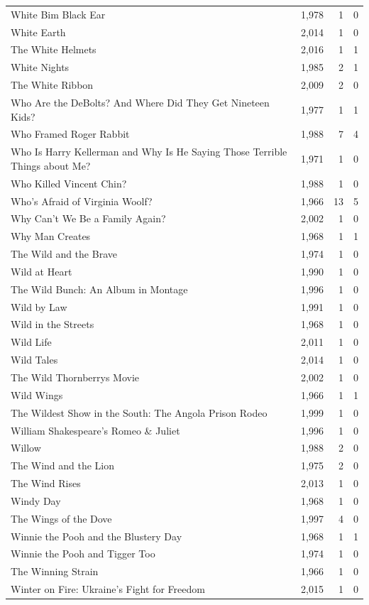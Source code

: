 \begin{tabular}{lrrr}
White Bim Black Ear & 1,978 & 1 & 0 \\
White Earth & 2,014 & 1 & 0 \\
The White Helmets & 2,016 & 1 & 1 \\
White Nights & 1,985 & 2 & 1 \\
The White Ribbon & 2,009 & 2 & 0 \\
Who Are the DeBolts? And Where Did They Get Nineteen Kids? & 1,977 & 1 & 1 \\
Who Framed Roger Rabbit & 1,988 & 7 & 4 \\
Who Is Harry Kellerman and Why Is He Saying Those Terrible Things about Me? & 1,971 & 1 & 0 \\
Who Killed Vincent Chin? & 1,988 & 1 & 0 \\
Who's Afraid of Virginia Woolf? & 1,966 & 13 & 5 \\
Why Can't We Be a Family Again? & 2,002 & 1 & 0 \\
Why Man Creates & 1,968 & 1 & 1 \\
The Wild and the Brave & 1,974 & 1 & 0 \\
Wild at Heart & 1,990 & 1 & 0 \\
The Wild Bunch: An Album in Montage & 1,996 & 1 & 0 \\
Wild by Law & 1,991 & 1 & 0 \\
Wild in the Streets & 1,968 & 1 & 0 \\
Wild Life & 2,011 & 1 & 0 \\
Wild Tales & 2,014 & 1 & 0 \\
The Wild Thornberrys Movie & 2,002 & 1 & 0 \\
Wild Wings & 1,966 & 1 & 1 \\
The Wildest Show in the South: The Angola Prison Rodeo & 1,999 & 1 & 0 \\
William Shakespeare's Romeo \& Juliet & 1,996 & 1 & 0 \\
Willow & 1,988 & 2 & 0 \\
The Wind and the Lion & 1,975 & 2 & 0 \\
The Wind Rises & 2,013 & 1 & 0 \\
Windy Day & 1,968 & 1 & 0 \\
The Wings of the Dove & 1,997 & 4 & 0 \\
Winnie the Pooh and the Blustery Day & 1,968 & 1 & 1 \\
Winnie the Pooh and Tigger Too & 1,974 & 1 & 0 \\
The Winning Strain & 1,966 & 1 & 0 \\
Winter on Fire: Ukraine's Fight for Freedom & 2,015 & 1 & 0 \\

\end{tabular}
